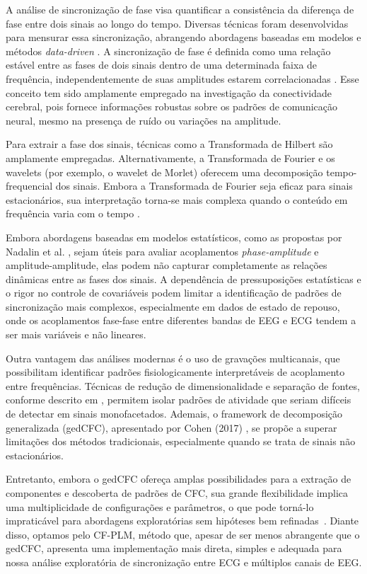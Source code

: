A análise de sincronização de fase visa quantificar a consistência da diferença de fase entre dois sinais ao longo do tempo. Diversas técnicas foram desenvolvidas para mensurar essa sincronização, abrangendo abordagens baseadas em modelos e métodos \textit{data-driven} \cite{seraj2018cerebral}. A sincronização de fase é definida como uma relação estável entre as fases de dois sinais dentro de uma determinada faixa de frequência, independentemente de suas amplitudes estarem correlacionadas \cite{seraj2018cerebral}. Esse conceito tem sido amplamente empregado na investigação da conectividade cerebral, pois fornece informações robustas sobre os padrões de comunicação neural, mesmo na presença de ruído ou variações na amplitude.

Para extrair a fase dos sinais, técnicas como a Transformada de Hilbert são amplamente empregadas. Alternativamente, a Transformada de Fourier e os wavelets (por exemplo, o wavelet de Morlet) oferecem uma decomposição tempo-frequencial dos sinais. Embora a Transformada de Fourier seja eficaz para sinais estacionários, sua interpretação torna-se mais complexa quando o conteúdo em frequência varia com o tempo \cite{singh2024evaluating}.

Embora abordagens baseadas em modelos estatísticos, como as propostas por Nadalin et al. \cite{nadalin2019statistical}, sejam úteis para avaliar acoplamentos \textit{phase-amplitude} e amplitude-amplitude, elas podem não capturar completamente as relações dinâmicas entre as fases dos sinais. A dependência de pressuposições estatísticas e o rigor no controle de covariáveis podem limitar a identificação de padrões de sincronização mais complexos, especialmente em dados de estado de repouso, onde os acoplamentos fase-fase entre diferentes bandas de EEG e ECG tendem a ser mais variáveis e não lineares.

Outra vantagem das análises modernas é o uso de gravações multicanais, que possibilitam identificar padrões fisiologicamente interpretáveis de acoplamento entre frequências. Técnicas de redução de dimensionalidade e separação de fontes, conforme descrito em \cite{cohen2017multivariate}, permitem isolar padrões de atividade que seriam difíceis de detectar em sinais monofacetados. Ademais, o framework de decomposição generalizada (gedCFC), apresentado por Cohen (2017) \cite{cohen2017multivariate}, se propõe a superar limitações dos métodos tradicionais, especialmente quando se trata de sinais não estacionários.

Entretanto, embora o gedCFC ofereça amplas possibilidades para a extração de componentes e descoberta de padrões de CFC, sua grande flexibilidade implica uma multiplicidade de configurações e parâmetros, o que pode torná-lo impraticável para abordagens exploratórias sem hipóteses bem refinadas~\cite{cohen2017multivariate}. Diante disso, optamos pelo CF-PLM, método que, apesar de ser menos abrangente que o gedCFC, apresenta uma implementação mais direta, simples e adequada para nossa análise exploratória de sincronização entre ECG e múltiplos canais de EEG.

